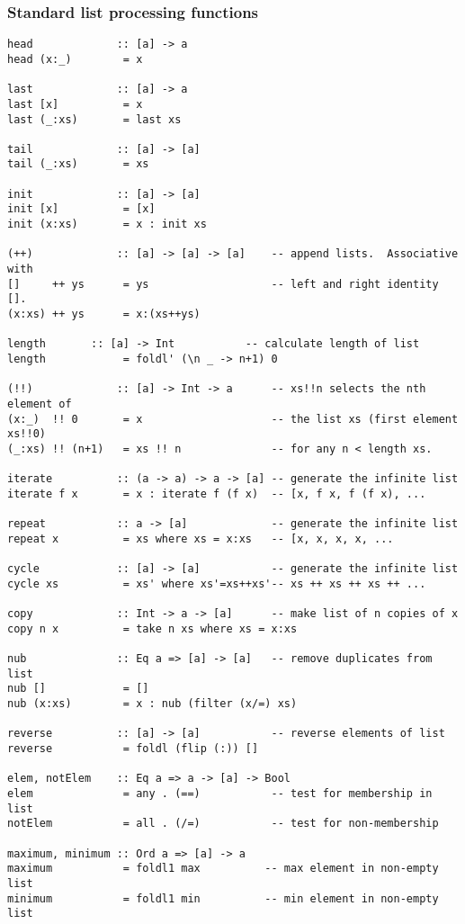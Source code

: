 \subsubsection*{Standard list processing functions}
\begin{verbatim}
head             :: [a] -> a
head (x:_)        = x

last             :: [a] -> a
last [x]          = x
last (_:xs)       = last xs

tail             :: [a] -> [a]
tail (_:xs)       = xs

init             :: [a] -> [a]
init [x]          = [x]
init (x:xs)       = x : init xs

(++)             :: [a] -> [a] -> [a]    -- append lists.  Associative with
[]     ++ ys      = ys                   -- left and right identity [].
(x:xs) ++ ys      = x:(xs++ys)

length		 :: [a] -> Int           -- calculate length of list
length            = foldl' (\n _ -> n+1) 0

(!!)             :: [a] -> Int -> a      -- xs!!n selects the nth element of
(x:_)  !! 0       = x                    -- the list xs (first element xs!!0)
(_:xs) !! (n+1)   = xs !! n              -- for any n < length xs.

iterate          :: (a -> a) -> a -> [a] -- generate the infinite list
iterate f x       = x : iterate f (f x)  -- [x, f x, f (f x), ...

repeat           :: a -> [a]             -- generate the infinite list
repeat x          = xs where xs = x:xs   -- [x, x, x, x, ...

cycle            :: [a] -> [a]           -- generate the infinite list
cycle xs          = xs' where xs'=xs++xs'-- xs ++ xs ++ xs ++ ...

copy             :: Int -> a -> [a]      -- make list of n copies of x
copy n x          = take n xs where xs = x:xs

nub              :: Eq a => [a] -> [a]   -- remove duplicates from list
nub []            = []
nub (x:xs)        = x : nub (filter (x/=) xs)

reverse          :: [a] -> [a]           -- reverse elements of list
reverse           = foldl (flip (:)) []

elem, notElem    :: Eq a => a -> [a] -> Bool
elem              = any . (==)           -- test for membership in list
notElem           = all . (/=)           -- test for non-membership

maximum, minimum :: Ord a => [a] -> a
maximum           = foldl1 max          -- max element in non-empty list
minimum           = foldl1 min          -- min element in non-empty list


\end{verbatim}
